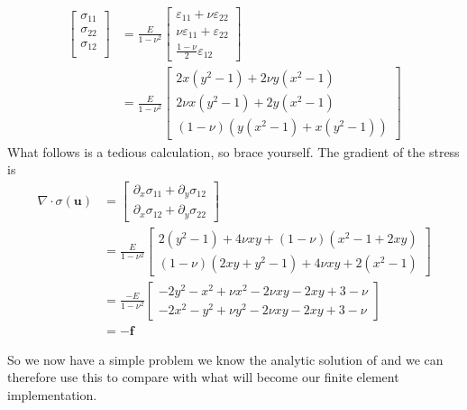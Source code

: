 \documentclass[paper=a4, fontsize=11pt]{scrartcl} %
\begin{document}
\begin{align*}
\begin{bmatrix}
\sigma_{11} \\
\sigma_{22} \\
\sigma_{12} \\
\end{bmatrix}
&= \frac{E}{1-\nu^2}\begin{bmatrix}
\varepsilon_{11} + \nu \varepsilon_{22} \\
\nu \varepsilon_{11} + \varepsilon_{22} \\
\frac{1-\nu}{2}\varepsilon_{12}
\end{bmatrix}
\\
&=\frac{E}{1-\nu^2}\begin{bmatrix}
2x(y^2-1) + 2\nu y(x^2-1) \\
2\nu x(y^2-1) +2y(x^2-1) \\
(1-\nu)(y(x^2-1)+x(y^2-1))
\end{bmatrix}
\end{align*} 
What follows is a tedious calculation, so brace yourself. The gradient of the stress is
\begin{align*}
\nabla \cdot \sigma(\boldsymbol{u}) &= \begin{bmatrix}
\partial_x \sigma_{11} + \partial_y \sigma_{12} \\
\partial_x \sigma_{12} + \partial_y \sigma_{22} 
\end{bmatrix} \\
&= \frac{E}{1-\nu^2}\begin{bmatrix}
2(y^2-1)+4\nu xy + (1-\nu)(x^2-1+2xy) \\
(1-\nu)(2xy + y^2-1)+4\nu xy +2(x^2 -1)
\end{bmatrix} \\
&= \frac{-E}{1-\nu^2}\begin{bmatrix}
-2y^2 - x^2 + \nu  x^2 - 2\nu xy - 2xy + 3 - \nu \\
-2x^2-y^2 + \nu y^2 - 2\nu xy -2xy + 3 -\nu
\end{bmatrix} \\
&= -\boldsymbol{f}
\end{align*}

So we now have a simple problem we know the analytic solution of and we can therefore use this to compare with what will become our finite element implementation.
\end{document}
